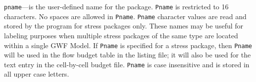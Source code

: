 \item \texttt{pname}---is the user-defined name for the package.  \texttt{Pname} is restricted to 16 characters.  No spaces are allowed in \texttt{Pname}.  \texttt{Pname} character values are read and stored by the program for stress packages only.  These names may be useful for labeling purposes when multiple stress packages of the same type are located within a single GWF Model.  If \texttt{Pname} is specified for a stress package, then \texttt{Pname} will be used in the flow budget table in the listing file; it will also be used for the text entry in the cell-by-cell budget file.  \texttt{Pname} is case insensitive and is stored in all upper case letters.


